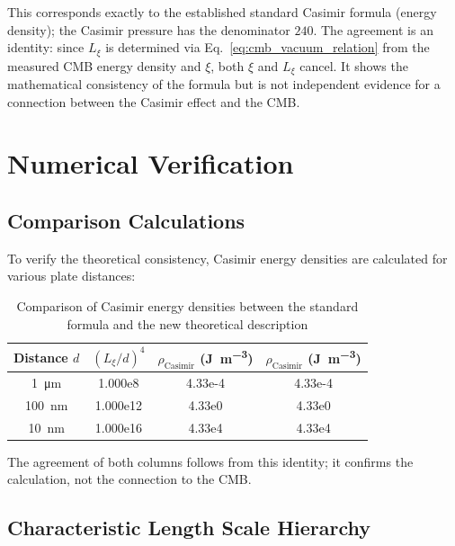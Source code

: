 	
	
	This corresponds exactly to the established standard Casimir formula (energy density); the Casimir pressure has the denominator $240$. The agreement is an identity: since \( L_\xi \) is determined via Eq.~\eqref{eq:cmb_vacuum_relation} from the measured CMB energy density and \( \xi \), both \( \xi \) and \( L_\xi \) cancel. It shows the mathematical consistency of the formula but is not independent evidence for a connection between the Casimir effect and the CMB.
	
	\section{Numerical Verification}
	
	\subsection{Comparison Calculations}
	
	To verify the theoretical consistency, Casimir energy densities are calculated for various plate distances:
	
	\begin{table}[H]
		\centering
		\begin{tabular}{c S[table-format=1.3e1] S[table-format=1.2e-2] S[table-format=1.2e-2]}
			\toprule
			Distance \( d \) & {\((L_\xi/d)^4\)} & {\(\rho_{\text{Casimir}}\) (\unit{\joule\per\meter\cubed})} & {\(\rho_{\text{Casimir}}\) (\unit{\joule\per\meter\cubed})} \\
			\midrule
			\SI{1}{\micro\meter} & 1.000e8 & 4.33e-4 & 4.33e-4 \\
			\SI{100}{\nano\meter} & 1.000e12 & 4.33e0 & 4.33e0 \\
			\SI{10}{\nano\meter} & 1.000e16 & 4.33e4 & 4.33e4 \\
			\bottomrule
		\end{tabular}
		\caption{Comparison of Casimir energy densities between the standard formula and the new theoretical description}
		\label{tab:casimir_comparison}
	\end{table}
	
	The agreement of both columns follows from this identity; it confirms the calculation, not the connection to the CMB.
	
	\subsection{Characteristic Length Scale Hierarchy}
	
